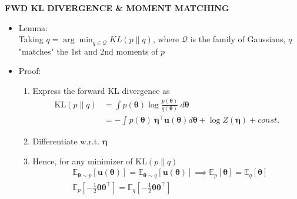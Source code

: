 \begin{whitebox}{\textbf{FWD KL DIVERGENCE \& MOMENT MATCHING}}
    \begin{itemize}
        \item Lemma:\\
        Taking $q=\arg\min_{q\in\mathcal{Q}}KL(p\|q)$, where $\mathcal{Q}$ is the family of Gaussians, $q$ "matches" the 1st and 2nd moments of $p$
        \item Proof:
        \begin{enumerate}
            \item Express the forward KL divergence as
            \begin{align*}
                \mathrm{KL}(p\|q)&=\int p(\bm{\theta})\log\frac{p(\bm{\theta})}{q(\bm{\theta})}\ d\bm{\theta}\\
                &=-\int p(\bm{\theta})\ \bm{\eta}^\top\bm{u}(\bm{\theta})d\bm{\theta}+\log Z(\bm{\eta})+const.
            \end{align*}
            \item Differentiate w.r.t. $\bm{\eta}$
            \begin{center}
            \end{center}
            \item Hence, for any minimizer of $\mathrm{KL}(p\|q)$
            \begin{align*}
                &\mathbb{E}_{\bm{\theta}\sim p}[\bm{u}(\bm{\theta})]=\mathbb{E}_{\bm{\theta}\sim q}[\bm{u}(\bm{\theta})]\implies\mathbb{E}_{p}[\bm{\theta}]=\mathbb{E}_{q}[\bm{\theta}]\\
                &\mathbb{E}_p\left[-\frac{1}{2}\bm{\theta}\bm{\theta}^\top\right]=\mathbb{E}_q\left[-\frac{1}{2}\bm{\theta}\bm{\theta}^\top\right]
            \end{align*}
        \end{enumerate}
    \end{itemize}
\end{whitebox}

